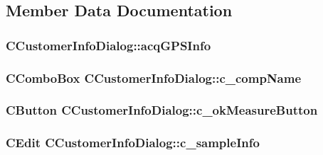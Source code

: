 \subsection{Member Data Documentation}
\hypertarget{classCCustomerInfoDialog_aa7f93c39debfd4e1b7afdb72b3517ce1}{
\subsubsection[{acqGPSInfo}]{ {\bf CCustomerInfoDialog::acqGPSInfo}}}
\label{classCCustomerInfoDialog_aa7f93c39debfd4e1b7afdb72b3517ce1}
\hypertarget{classCCustomerInfoDialog_acb8d4e1a73a7d331e7c656224cedd9a6}{
\subsubsection[{c\_\-compName}]{\setlength{\rightskip}{0pt plus 5cm}CComboBox {\bf CCustomerInfoDialog::c\_\-compName}}}
\label{classCCustomerInfoDialog_acb8d4e1a73a7d331e7c656224cedd9a6}
\hypertarget{classCCustomerInfoDialog_af8352bb152c9c8be8daa68e171c87c5e}{
\subsubsection[{c\_\-okMeasureButton}]{\setlength{\rightskip}{0pt plus 5cm}CButton {\bf CCustomerInfoDialog::c\_\-okMeasureButton}}}
\label{classCCustomerInfoDialog_af8352bb152c9c8be8daa68e171c87c5e}
\hypertarget{classCCustomerInfoDialog_a22e65d8624be21f0c8dd44622b8730c9}{
\subsubsection[{c\_\-sampleInfo}]{\setlength{\rightskip}{0pt plus 5cm}CEdit {\bf CCustomerInfoDialog::c\_\-sampleInfo}}}
\label{classCCustomerInfoDialog_a22e65d8624be21f0c8dd44622b8730c9}
